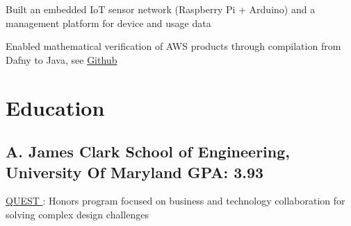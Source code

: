 \documentclass[print]{jack-resume}
\begin{document}
\begin{tightemize}
    \item Built an embedded IoT sensor network (Raspberry Pi + Arduino) and a management platform for device and usage data
\end{tightemize}

\begin{tightemize}
    \item Enabled mathematical verification of AWS products through compilation from Dafny to Java, see \href{https://github.com/dafny-lang/dafny}{Github \ExternalLink}
\end{tightemize}
\sectionsep

\section{Education}
\subsection{A. James Clark School of Engineering, University Of Maryland \hfill GPA: 3.93}
\begin{tightemize}
    \item \color{darkmodePrimary}\href{https://www.rhsmith.umd.edu/programs/undergraduate-programs/academics/fellows-special-programs/quest}{QUEST \ExternalLink}: Honors program focused on business and technology collaboration for solving complex design challenges
\end{tightemize}

\begin{minipage}[t]{0.04\textwidth}
    \hfill
\end{minipage}
\end{document}

